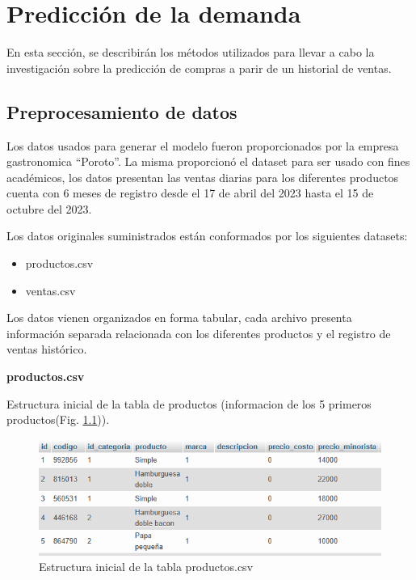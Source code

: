 \fancyhead{}
\fancyfoot{}
\cfoot{\thepage}


\chapter{Predicción de la  demanda}
En esta sección, se describirán los métodos utilizados para llevar a cabo la investigación sobre la predicción de compras a parir de un historial de ventas.

\section{Preprocesamiento de datos}

Los datos usados para generar el modelo fueron proporcionados por la empresa gastronomica “Poroto”. La misma proporcionó el dataset para ser usado con fines académicos, los datos presentan las ventas diarias para los diferentes productos  cuenta con 6 meses de registro desde el 17 de abril del 2023 hasta el 15 de octubre del 2023.

Los datos originales suministrados están conformados por los siguientes datasets: 
\begin{itemize}
  \item productos.csv 
  \item ventas.csv
\end{itemize}

Los datos vienen organizados en forma tabular, cada archivo presenta información separada relacionada con los diferentes productos y el registro de ventas histórico.

\vspace{1\baselineskip}
\textbf{productos.csv}

Estructura inicial de la tabla de productos (informacion de los 5 primeros productos(Fig. \ref{fig:priemeros_5productos})).

\begin{figure}[H]
  \begin{center}
    \includegraphics[scale=0.90]{./tabla_producto.png}
    \caption{Estructura inicial de la tabla productos.csv}
    \label{fig:priemeros_5productos}
  \end{center}
\end{figure}

